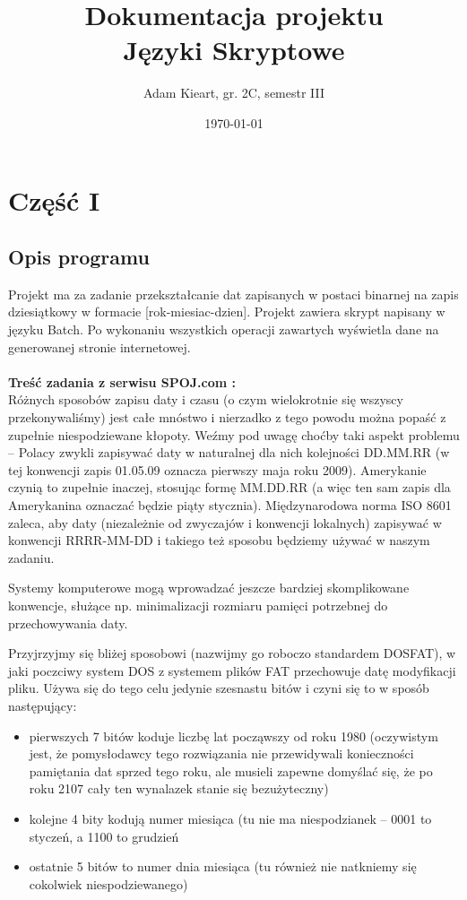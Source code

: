 \documentclass[12pt,a4paper]{article}
\begin{document}
	
	\title{Dokumentacja projektu\\ Języki Skryptowe}
	\author{Adam Kieart, gr. 2C, semestr III}
	\date{\today}
	
	\maketitle
	\newpage
	\section*{Część I}
	\subsection*{Opis programu}
	 Projekt ma za zadanie przekształcanie dat zapisanych w postaci binarnej na zapis dziesiątkowy w formacie [rok-miesiac-dzien]. Projekt zawiera skrypt napisany w języku Batch. Po wykonaniu wszystkich operacji zawartych wyświetla dane na generowanej stronie internetowej.
	 \\
	\\ 	
    \textbf{Treść zadania z serwisu SPOJ.com :}
    \\ 	
    Różnych sposobów zapisu daty i czasu (o czym wielokrotnie się wszyscy przekonywaliśmy) jest całe mnóstwo i nierzadko z tego powodu można popaść z zupełnie niespodziewane kłopoty. Weźmy pod uwagę choćby taki aspekt problemu – Polacy zwykli zapisywać daty w naturalnej dla nich kolejności DD.MM.RR (w tej konwencji zapis 01.05.09 oznacza pierwszy maja roku 2009). Amerykanie czynią to zupełnie inaczej, stosując formę MM.DD.RR (a więc ten sam zapis dla Amerykanina oznaczać będzie piąty stycznia). Międzynarodowa norma ISO 8601 zaleca, aby daty (niezależnie od zwyczajów i konwencji lokalnych) zapisywać w konwencji RRRR-MM-DD i takiego też sposobu będziemy używać w naszym zadaniu.

Systemy komputerowe mogą wprowadzać jeszcze bardziej skomplikowane konwencje, służące np. minimalizacji rozmiaru pamięci potrzebnej do przechowywania daty.

Przyjrzyjmy się bliżej sposobowi (nazwijmy go roboczo standardem DOSFAT), w jaki poczciwy system DOS z systemem plików FAT przechowuje datę modyfikacji pliku. Używa się do tego celu jedynie szesnastu bitów i czyni się to w sposób następujący:

 
\begin{itemize}
\item   pierwszych 7 bitów koduje liczbę lat począwszy od roku 1980 (oczywistym jest, że pomysłodawcy tego rozwiązania nie przewidywali konieczności pamiętania dat sprzed tego roku, ale musieli zapewne domyślać się, że po roku 2107 cały ten wynalazek stanie się bezużyteczny)
\end{itemize}
\begin{itemize}
\item  kolejne 4 bity kodują numer miesiąca (tu nie ma niespodzianek – 0001 to styczeń, a 1100 to grudzień
\end{itemize}
\begin{itemize}
\item  ostatnie 5 bitów to numer dnia miesiąca (tu również nie natkniemy się cokolwiek niespodziewanego)
\end{itemize}
\end{document}
